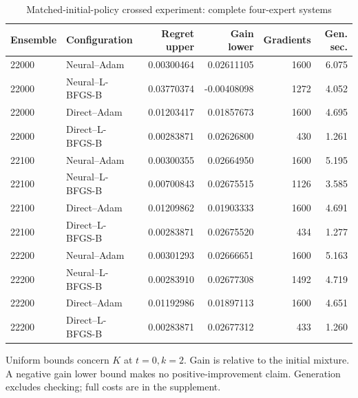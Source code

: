 \begin{table}[htbp]
\caption{Matched-initial-policy crossed experiment: complete four-expert systems}\label{tab:r22crossed}
\small\begin{tabular}{llrrrr}
\toprule
Ensemble & Configuration & Regret upper & Gain lower & Gradients & Gen. sec.\\\midrule
22000 & Neural--Adam & 0.00300464 & 0.02611105 & 1600 & 6.075\\
22000 & Neural--L-BFGS-B & 0.03770374 & -0.00408098 & 1272 & 4.052\\
22000 & Direct--Adam & 0.01203417 & 0.01857673 & 1600 & 4.695\\
22000 & Direct--L-BFGS-B & 0.00283871 & 0.02626800 & 430 & 1.261\\
22100 & Neural--Adam & 0.00300355 & 0.02664950 & 1600 & 5.195\\
22100 & Neural--L-BFGS-B & 0.00700843 & 0.02675515 & 1126 & 3.585\\
22100 & Direct--Adam & 0.01209862 & 0.01903333 & 1600 & 4.691\\
22100 & Direct--L-BFGS-B & 0.00283871 & 0.02675520 & 434 & 1.277\\
22200 & Neural--Adam & 0.00301293 & 0.02666651 & 1600 & 5.163\\
22200 & Neural--L-BFGS-B & 0.00283910 & 0.02677308 & 1492 & 4.719\\
22200 & Direct--Adam & 0.01192986 & 0.01897113 & 1600 & 4.651\\
22200 & Direct--L-BFGS-B & 0.00283871 & 0.02677312 & 433 & 1.260\\
\bottomrule\end{tabular}
\par\smallskip\parbox{.96\textwidth}{\footnotesize Uniform bounds concern $K$ at $t=0,k=2$. Gain is relative to the initial mixture. A negative gain lower bound makes no positive-improvement claim. Generation excludes checking; full costs are in the supplement.}
\end{table}
